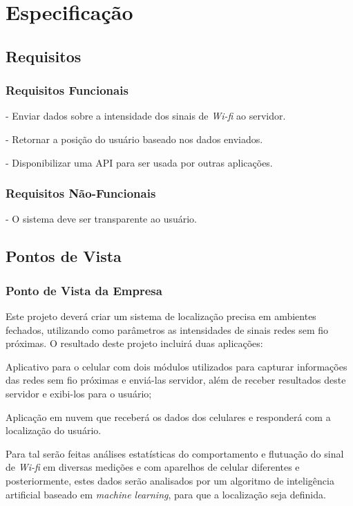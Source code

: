 
\chapter{Especificação}\label{chp:espec}
\section{Requisitos}\label{sec:req}

\subsection{Requisitos Funcionais}
- Enviar dados sobre a intensidade dos sinais de \textit{Wi-fi} ao servidor. \par
- Retornar a posição do usuário baseado nos dados enviados.\par
- Disponibilizar uma API para ser usada por outras aplicações.\par


\subsection{Requisitos Não-Funcionais}

- O sistema deve ser transparente ao usuário.\par

\section{Pontos de Vista}\label{sec:req}
\subsection{Ponto de Vista da Empresa}
Este projeto deverá criar um sistema de localização precisa em ambientes fechados, utilizando como parâmetros as intensidades de sinais redes sem fio próximas. O resultado deste projeto incluirá duas aplicações:\par
Aplicativo para o celular com dois módulos utilizados para capturar informações das redes sem fio próximas e enviá-las servidor, além de receber resultados deste servidor e exibi-los para o usuário;\par
Aplicação em nuvem que receberá os dados dos celulares e responderá com a localização do usuário.\par
Para tal serão feitas análises estatísticas do comportamento e flutuação do sinal de \textit{Wi-fi} em diversas medições e com aparelhos de celular diferentes e posteriormente, estes dados serão analisados por um algoritmo de inteligência artificial baseado em \textit{machine learning}, para que a localização seja definida.
